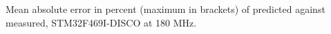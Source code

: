 \begin{table}[t]
\centering
\caption{Hardware Validation Error (\%)}
\label{tab:hardware}
\footnotesize
{}

\vspace{2pt}
{\footnotesize Mean absolute error in percent (maximum in brackets) of predicted against measured, STM32F469I-DISCO at 180 MHz.}
\end{table}
